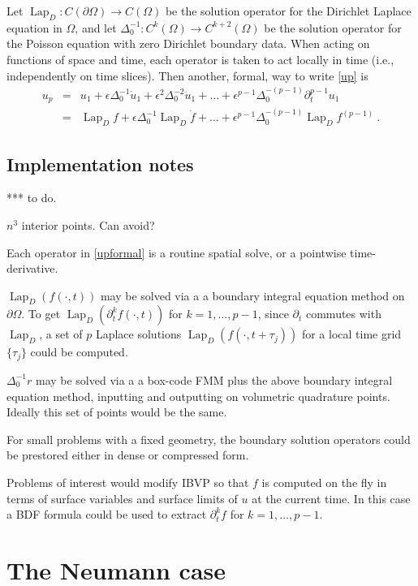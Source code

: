 \documentclass[10pt]{article}
\newcommand{\bea}{\begin{eqnarray}}
\newcommand{\eea}{\end{eqnarray}}
\newcommand{\pO}{{\partial\Omega}}
\newcommand{\eps}{\epsilon}
\newcommand{\dt}{\partial_t}
\DeclareMathOperator{\Lap}{Lap}
\begin{document}
Let $\Lap_D: C(\pO) \to C(\Omega)$ be the solution operator for the Dirichlet
Laplace equation in $\Omega$, and let $\Delta_0^{-1} : C^k(\Omega) \to
C^{k+2}(\Omega)$ be the solution operator for the Poisson equation with
zero Dirichlet boundary data. When acting on functions of
space and time, each operator is taken to act locally in time
(i.e., independently on time slices).
Then another, formal, way to write \eqref{up} is
\bea
u_p &=& u_1 + \eps \Delta_0^{-1} \dot u_1 + \eps^2 \Delta_0^{-2} \ddot u_1 +
\dots + \eps^{p-1} \Delta_0^{-(p-1)} \dt^{p-1} u_1
\\
&=&
\Lap_D f + \eps \Delta_0^{-1} \Lap_D \dot f + \ldots
+ \eps^{p-1} \Delta_0^{-(p-1)} \Lap_D f^{(p-1)}
~.
\label{upformal}
\eea



\subsection{Implementation notes}


*** to do.

$n^3$ interior points. Can avoid?

Each operator in \eqref{upformal} is a routine spatial solve, or a pointwise
time-derivative.

$\Lap_D(f(\cdot,t))$ may be solved via a 
a boundary integral equation method on $\pO$.
To get $\Lap_D(\dt^kf(\cdot,t))$ for $k=1,\dots,p-1$,
since $\dt$ commutes with $\Lap_D$, a set of $p$ Laplace solutions
$\Lap_D(f(\cdot,t+\tau_j))$ for a local time grid $\{\tau_j\}$
could be computed.

$\Delta_0^{-1} r$ may be solved via a 
a box-code FMM plus the above boundary integral
equation method, inputting and outputting on volumetric quadrature
points. Ideally this set of points would be the same.

For small problems with a fixed geometry, the boundary solution operators
could be prestored either in dense or compressed form.

Problems of interest would modify IBVP so that $f$ is computed on the
fly in terms of surface variables and surface limits of $u$ at the current time.
In this case a BDF formula could be used to extract $\dt^k f$ for $k=1,\dots,p-1$.


\section{The Neumann case}
\end{document}
